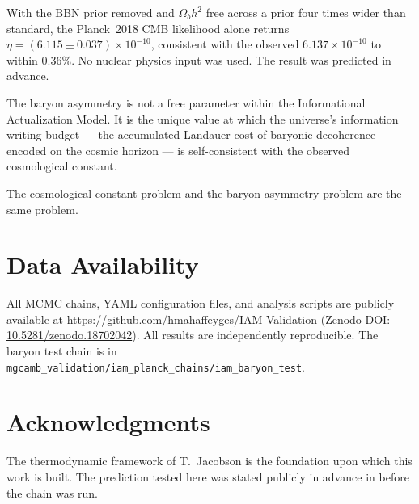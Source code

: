 \documentclass[12pt,a4paper]{article}
\begin{document}
With the BBN prior removed and $\Omega_b h^2$ free across a prior
four times wider than standard, the Planck~2018 CMB likelihood
alone returns $\eta = (6.115 \pm 0.037) \times 10^{-10}$, consistent with
the observed $6.137 \times 10^{-10}$ to within $0.36\%$. No nuclear physics
input was used. The result was predicted in advance.

The baryon asymmetry is not a free parameter within the
Informational Actualization Model. It is the unique value at
which the universe's information writing budget — the accumulated
Landauer cost of baryonic decoherence encoded on the cosmic horizon
— is self-consistent with the observed cosmological constant.

The cosmological constant problem and the baryon asymmetry problem
are the same problem.

\section*{Data Availability}

All MCMC chains, YAML configuration files, and analysis scripts
are publicly available at
\url{https://github.com/hmahaffeyges/IAM-Validation}
(Zenodo DOI:
\href{https://doi.org/10.5281/zenodo.18702042}{10.5281/zenodo.18702042}).
All results are independently reproducible. The baryon test chain is in
\texttt{mgcamb\_validation/iam\_planck\_chains/iam\_baryon\_test}.

\section*{Acknowledgments}

The thermodynamic framework of T.\ Jacobson \citep{jacobson1995}
is the foundation upon which this work is built. The prediction
tested here was stated publicly in advance in
\citet{mahaffey2026_baryon} before the chain was run.
\end{document}
